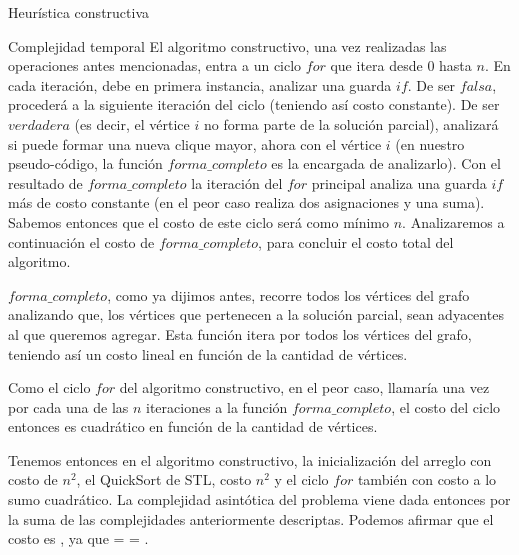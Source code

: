 \begin{section}{Heurística constructiva}
\begin{subsection}{Complejidad temporal}
			El algoritmo constructivo, una vez realizadas las operaciones antes mencionadas, entra a un ciclo $for$ que itera desde $0$ hasta $n$. En cada iteración, debe en primera instancia, analizar una guarda $if$. De ser $falsa$, procederá a la siguiente iteración del ciclo (teniendo así costo constante). De ser $verdadera$ (es decir, el vértice $i$ no forma parte de la solución parcial), analizará si puede formar una nueva clique mayor, ahora con el vértice $i$ (en nuestro pseudo-código, la función $forma\_completo$ es la encargada de analizarlo). Con el resultado de $forma\_completo$ la iteración del $for$ principal analiza una guarda $if$ más de costo constante (en el peor caso realiza dos asignaciones y una suma). Sabemos entonces que el costo de este ciclo será como mínimo $n$. Analizaremos a continuación el costo de $forma\_completo$, para concluir el costo total del algoritmo.
			
			$forma\_completo$, como ya dijimos antes, recorre todos los vértices del grafo analizando que, los vértices que pertenecen a la solución parcial, sean adyacentes al que queremos agregar. Esta función itera por todos los vértices del grafo, teniendo así un costo lineal en función de la cantidad de vértices.
			
			Como el ciclo $for$ del algoritmo constructivo, en el peor caso, llamaría una vez por cada una de las $n$ iteraciones a la función $forma\_completo$, el costo del ciclo entonces es cuadrático en función de la cantidad de vértices.
			
			Tenemos entonces en el algoritmo constructivo, la inicialización del arreglo con costo de $n^2$, el QuickSort de STL, costo $n^2$ y el ciclo $for$ también con costo a lo sumo cuadrático. La complejidad asintótica del problema viene dada entonces por la suma de las complejidades anteriormente descriptas. Podemos afirmar que el costo es , ya que  =  = .
			
		\end{subsection}

\end{section}

